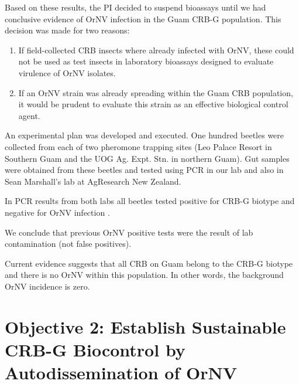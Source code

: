 \documentclass[12pt,letterpaper,english,bibliography=totocnumbered, abstract=on]{scrartcl}
\begin{document}
Based on these results, the PI decided to suspend bioassays until we had conclusive evidence of OrNV infection in the Guam CRB-G population.  This decision was made for two reasons:

\begin{enumerate}
	\item If field-collected CRB insects where already infected with OrNV, these could not be used as test insects in laboratory bioassays designed to evaluate virulence of OrNV isolates.
	\item If an OrNV strain was already spreading within the Guam CRB population, it would be prudent to evaluate this strain as an effective biological control agent. 
\end{enumerate}

An experimental plan \cite{mooreExperimentalPlanDetermining2020} was developed and executed. One hundred beetles were collected from each of two pheromone trapping sites (Leo Palace Resort in Southern Guam and the UOG Ag. Expt. Stn. in northern Guam). Gut samples were obtained from these beetles and tested using PCR in our lab and also in Sean Marshall's lab at AgResearch New Zealand. 

In PCR results from both labs all beetles tested positive for CRB-G biotype and negative for OrNV infection \cite{graselaInvestigationDeterminePresence2020}. 

We conclude that previous OrNV positive tests were the result of lab contamination (not false positives). 

Current evidence suggests that all CRB on Guam belong to the CRB-G biotype and there is no OrNV within this population. In other words, the background OrNV incidence is zero.

\clearpage
\section{Objective 2: Establish Sustainable CRB-G Biocontrol by Autodissemination of OrNV}
\end{document}
